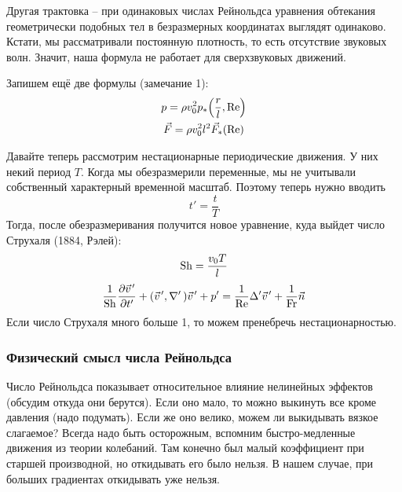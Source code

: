 Другая трактовка -- при одинаковых числах Рейнольдса уравнения обтекания геометрически подобных тел в безразмерных координатах выглядят одинаково.
Кстати, мы рассматривали постоянную плотность, то есть отсутствие звуковых волн. Значит, наша формула не работает для сверхзвуковых движений.

Запишем ещё две формулы (замечание 1):
\begin{gather}
    p = \rho v_0^2 p_* \qty(\frac{r}{l}, \Re) \\
    \vec{F} = \rho v_0^2 l^2 \vec{F}_* (\Re) 
\end{gather}

Давайте теперь рассмотрим нестационарные периодические движения. У них некий период $T$. Когда мы обезразмерили переменные, мы не учитывали собственный характерный временной масштаб. Поэтому теперь нужно вводить
\begin{equation}
    t'=\frac{t}{T}
\end{equation}
Тогда, после обезразмеривания получится новое уравнение, куда выйдет число Струхаля (1884, Рэлей):
\begin{equation}
    \operatorname{Sh} = \frac{v_0 T}{l}
\end{equation}
\begin{equation}
    \frac{1}{\Sh}\pdv{\pvec{v}'}{t'}+(\pvec{v}', \nabla'\,)\pvec{v}' + p'=
    \frac{1}{\Re}\Delta' \pvec{v}' + \frac{1}{\Fr} \vec{n}
\end{equation}
Если число Струхаля много больше 1, то можем пренебречь нестационарностью. 

\subsubsection{Физический смысл числа Рейнольдса}

Число Рейнольдса показывает относительное влияние нелинейных эффектов (обсудим откуда они берутся). 
Если оно мало, то можно выкинуть все кроме давления (надо подумать).
Если же оно велико, можем ли выкидывать вязкое слагаемое? 
Всегда надо быть осторожным, вспомним быстро-медленные движения из теории колебаний.
Там конечно был малый коэффициент при старшей производной, но откидывать его было нельзя. 
В нашем случае, при больших градиентах откидывать уже нельзя.


